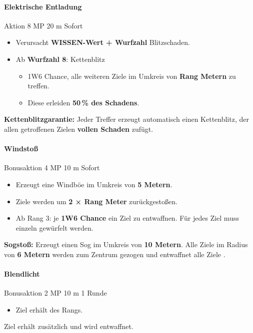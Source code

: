 \paragraph*{Elektrische Entladung}
\spellcard
{}
{Aktion}
{8 MP}
{20 m}
{Sofort}
{
	\begin{itemize}
		\item Verursacht \textbf{WISSEN-Wert + Wurfzahl} Blitzschaden.
		\item Ab \textbf{Wurfzahl 8}: Kettenblitz
		\begin{itemize}
			\item 1W6 Chance, alle weiteren Ziele im Umkreis von
			\textbf{Rang Metern} zu treffen.
			\item Diese erleiden \textbf{50\,\% des Schadens}.
		\end{itemize}
	\end{itemize}
}
{
	\textbf{Kettenblitzgarantie:}
	Jeder Treffer erzeugt automatisch einen Kettenblitz,
	der allen getroffenen Zielen \textbf{vollen Schaden} zufügt.
}

\paragraph*{Windstoß}
\spellcard
{}
{Bonusaktion}
{4 MP}
{10 m}
{Sofort}
{
	\begin{itemize}
		\item Erzeugt eine Windböe im Umkreis von \textbf{5 Metern}.
		\item Ziele werden um \textbf{2 × Rang Meter} zurückgestoßen.
		\item Ab Rang 3: je \textbf{1W6 Chance} ein Ziel zu entwaffnen. Für jedes Ziel muss einzeln gewürfelt werden.
	\end{itemize}
}
{
	\textbf{Sogstoß:}
	Erzeugt einen Sog im Umkreis von \textbf{10 Metern}.
	Alle Ziele im Radius von \textbf{6 Metern} werden
	zum Zentrum gezogen und entwaffnet alle Ziele . 
}

\paragraph*{Blendlicht}
\spellcard
{}
{Bonusaktion}
{2 MP}
{10 m}
{1 Runde}
{
	\begin{itemize}
		\item Ziel erhält  des Rangs.
	\end{itemize}
}
{
	Ziel erhält zusätzlich  und wird entwaffnet.
}

